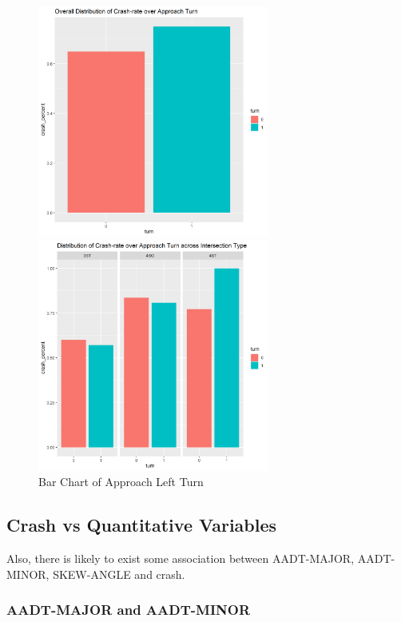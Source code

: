 \documentclass[11pt]{scrartcl} %
\begin{document}
\begin{figure}[H]
\begin{minipage}[t]{0.5\linewidth}
\centering
\includegraphics[width=3in]{image/approach-turn-all.png}
\small
\end{minipage}
\begin{minipage}[t]{0.5\linewidth}
\centering
\includegraphics[width=3in]{image/approach-turn.png}
\small
\end{minipage}
\caption{Bar Chart of Approach Left Turn}
\end{figure}

\subsection{Crash vs Quantitative Variables}

Also, there is likely to exist some association between AADT-MAJOR, AADT-MINOR, SKEW-ANGLE and crash.

\subsubsection{AADT-MAJOR and AADT-MINOR}
\end{document}
